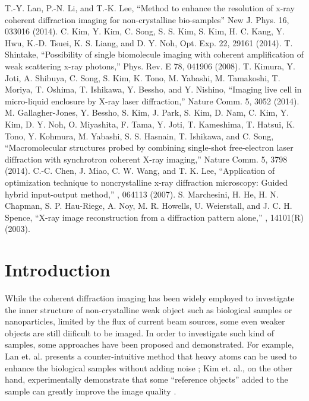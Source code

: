 \documentclass[10pt,letterpaper]{article}
\begin{document}
\begin{thebibliography}{10}
 T.-Y. Lan, P.-N. Li, and T.-K. Lee, ``Method to enhance the resolution of x-ray coherent diffraction imaging for non-crystalline bio-samples'' New J. Phys. 16, 033016 (2014).
 C. Kim, Y. Kim, C. Song, S. S. Kim, S. Kim, H. C. Kang, Y. Hwu, K.-D. Tsuei, K. S. Liang, and D. Y. Noh, Opt. Exp. 22, 29161 (2014).
 T. Shintake, ``Possibility of single biomolecule imaging with coherent amplification of weak scattering x-ray photons,'' Phys. Rev. E 78, 041906 (2008).
 T. Kimura, Y. Joti, A. Shibuya, C. Song, S. Kim, K. Tono, M. Yabashi, M. Tamakoshi, T. Moriya, T. Oshima, T. Ishikawa, Y. Bessho, and Y. Nishino, ``Imaging live cell in micro-liquid enclosure by X-ray laser diffraction,'' Nature Comm. 5, 3052 (2014).
 M. Gallagher-Jones, Y. Bessho, S. Kim, J. Park, S. Kim, D. Nam, C. Kim, Y. Kim, D. Y. Noh, O. Miyashita, F. Tama, Y. Joti, T. Kameshima, T. Hatsui, K. Tono, Y. Kohmura, M. Yabashi, S. S. Hasnain, T. Ishikawa, and C. Song, ``Macromolecular structures probed by combining single-shot free-electron laser diffraction with synchrotron coherent X-ray imaging,'' Nature Comm. 5, 3798 (2014).
 C.-C. Chen, J. Miao, C. W. Wang, and T. K. Lee, ``Application of optimization technique to noncrystalline x-ray diffraction microscopy: Guided hybrid input-output method,'' , 064113 (2007).
 S. Marchesini, H. He, H. N. Chapman, S. P. Hau-Riege, A. Noy, M. R. Howells, U. Weierstall, and J. C. H. Spence, ``X-ray image reconstruction from a diffraction pattern alone,'' , 14101(R) (2003).
\end{thebibliography}

\section{Introduction}
While the coherent diffraction imaging has been widely employed to investigate the inner structure of non-crystalline weak object such as biological samples or nanoparticles, limited by the flux of current beam sources, some even weaker objects are still diificult to be imaged. 
In order to investigate such kind of samples, some approaches have been proposed and demonstrated. For example, Lan et. al. presents a counter-intuitive method that heavy atoms can be used to enhance the biological samples without adding noise \cite{template}; Kim et. al., on the other hand, experimentally demonstrate that some ``reference objects'' added to the sample can greatly improve the image quality \cite{ref-obj}. 
\end{document}
